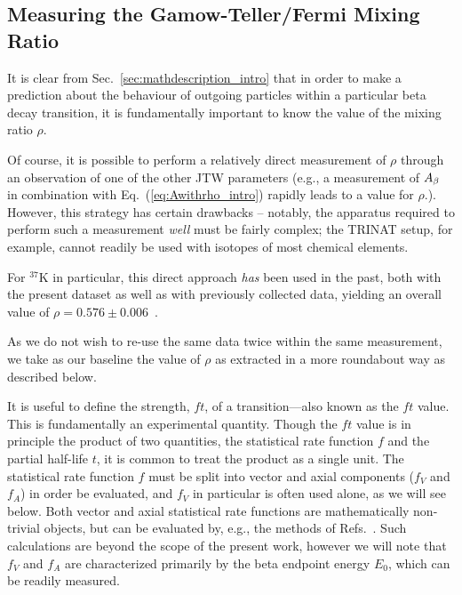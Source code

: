 \subsection{Measuring the Gamow-Teller/Fermi Mixing Ratio}
\label{sec:extractinglambda}
It is clear from Sec.~\ref{sec:mathdescription_intro} that in order to make a prediction about the behaviour of outgoing particles within a particular beta decay transition, it is fundamentally important to know the value of the mixing ratio $\rho$.

Of course, it is possible to perform a relatively direct measurement of $\rho$ through an observation of one of the other \ac{JTW} parameters (e.g., a measurement of $A_{\beta}$ in combination with Eq.~(\ref{eq:Awithrho_intro}) rapidly leads to a value for $\rho$.).  However, this strategy has certain drawbacks -- notably, the apparatus required to perform such a measurement \emph{well} must be fairly complex;  the TRINAT setup, for example, cannot readily be used with isotopes of most chemical elements.  

For $^{37}$K in particular, this direct approach \emph{has} been used in the past, both with the present dataset as well as with previously collected data, yielding an overall value of $\rho=0.576 \pm 0.006$~\cite{ben_Abeta}\cite{shidling2014}\cite{dan_Bnu}.

As we do not wish to re-use the same data twice within the same measurement, we take as our baseline the value of $\rho$ as extracted in a more roundabout way as described below.


It is useful to define the strength, $ft$, of a transition---also known as the $ft$ value.  This is fundamentally an experimental quantity.  Though the $ft$ value is in principle the product of two quantities, the statistical rate function $f$ and the partial half-life $t$, it is common to treat the product as a single unit.  
%
The statistical rate function $f$ must be split into vector and axial components ($f_V$ and $f_A$) in order be evaluated, and $f_V$ in particular is often used alone, as we will see below.  Both vector and axial statistical rate functions are mathematically non-trivial objects\cite{towner_hardy_1995_frombook}\cite{HardyTowner2005_Superallowed}, but can be evaluated by, e.g., the methods of Refs.~\cite{wilkinson2}\cite{wilkinson3}\cite{wilkinson4}.  
Such calculations are beyond the scope of the present work, however we will note that 
$f_V$ and $f_A$ are characterized primarily by the beta endpoint energy $E_0$, which can be readily measured.  

